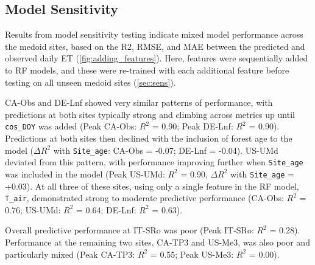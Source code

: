 \subsection{Model Sensitivity} \label{sec:model_sens}
Results from model sensitivity testing indicate mixed model performance across the medoid sites, based on the \ac{R2}, \ac{RMSE}, and \ac{MAE} between the predicted and observed daily \ac{ET} (\autoref{fig:adding_features}). Here, features were sequentially added to \ac{RF} models, and these were re-trained with each additional feature before testing on all unseen medoid sites (\ref{sec:sens}).
\par CA-Obs and DE-Lnf showed very similar patterns of performance, with predictions at both sites typically strong and climbing across metrics up until \texttt{cos\_DOY} was added (Peak CA-Obs: $R^2$ = 0.90; Peak DE-Lnf: $R^2$ = 0.90). Predictions at both sites then declined with the inclusion of forest age to the model ($\Delta R^2$ with \texttt{Site\_age}: CA-Obs = -0.07; DE-Lnf = -0.04). US-UMd deviated from this pattern, with performance improving further when \texttt{Site\_age} was included in the model (Peak US-UMd: $R^2$ = 0.90, $\Delta$$R^2$ with \texttt{Site\_age} = +0.03). At all three of these sites, using only a single feature in the \ac{RF} model, \texttt{T\_air}, demonstrated strong to moderate predictive performance (CA-Obs: $R^2$ = 0.76; US-UMd: $R^2$ = 0.64; DE-Lnf: $R^2$ = 0.63).
\par Overall predictive performance at IT-SRo was poor (Peak IT-SRo: $R^2$ = 0.28). Performance at the remaining two sites, CA-TP3 and US-Me3, was also poor and particularly mixed (Peak CA-TP3: $R^2$ = 0.55; Peak US-Me3: $R^2$ = 0.00). 


